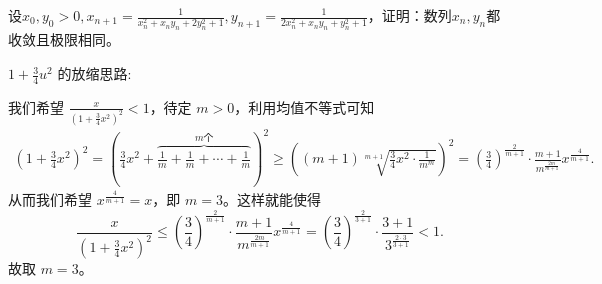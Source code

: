 \documentclass[lang=cn,newtx,10pt,scheme=chinese]{elegantbook}
\begin{document}
\begin{example}
设\(x_0,y_0 > 0,x_{n + 1}=\frac{1}{x_n^2 + x_ny_n + 2y_n^2 + 1},y_{n + 1}=\frac{1}{2x_n^2 + x_ny_n + y_n^2 + 1}\)，证明：数列\(x_n,y_n\)都收敛且极限相同。
\end{example}
\begin{remark}
\hypertarget{均值放缩的思路}{\(1+\frac{3}{4}u^2\) 的放缩思路:}我们希望 \(\frac{x}{(1+\frac{3}{4}x^2)^2}<1\)，待定 \(m > 0\)，利用均值不等式可知
\begin{align*}
\left(1+\frac{3}{4}x^2\right)^2=\left(\frac{3}{4}x^2+\overbrace{\frac{1}{m}+\frac{1}{m}+\cdots +\frac{1}{m}}^{m\text{个}}\right)^2
\geqslant \left((m + 1)\sqrt[m + 1]{\frac{3}{4}x^2\cdot\frac{1}{m^m}}\right)^2
=\left(\frac{3}{4}\right)^{\frac{2}{m + 1}}\cdot\frac{m + 1}{m^{\frac{2m}{m + 1}}}x^{\frac{4}{m + 1}}.
\end{align*}
从而我们希望 \(x^{\frac{4}{m + 1}} = x\)，即 \(m = 3\)。这样就能使得
\[
\frac{x}{(1+\frac{3}{4}x^2)^2}\leqslant \left(\frac{3}{4}\right)^{\frac{2}{m + 1}}\cdot\frac{m + 1}{m^{\frac{2m}{m + 1}}}x^{\frac{4}{m + 1}}=\left(\frac{3}{4}\right)^{\frac{2}{3 + 1}}\cdot\frac{3 + 1}{3^{\frac{2\cdot 3}{3 + 1}}}<1.
\]
故取 \(m = 3\)。
\end{remark}
\end{document}
